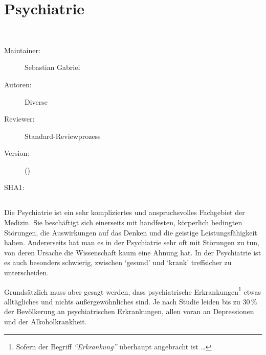 \def\ChapterCode{PSY}
\chapter
[\CO{[PSY]} Psychiatrie]
{Psychiatrie}
\label{chp:PSY}

\ChapterIntro
{%
~~~
}
{%
\begin{description}
  \item[Maintainer:] Sebastian Gabriel
  \item[Autoren:] Diverse
  \item[Reviewer:] Standard-Reviewprozess
  \item[Version:] {\VarDocVersionTypeName} ({\VarDocVersionTypeDescription})
  \item[SHA1:] {\DocGitCommit}
\end{description}

{\TxTeilkapitelAASS}
}

\clearpage


\nocite{WunnPsych1,OHCSP7}
\label{topic:unterbringungsgesetz}


\section{}

{%
Die Psychiatrie ist ein sehr kompliziertes und
anspruchsvolles Fachgebiet der Medizin. Sie beschäftigt
sich einerseits mit handfesten, körperlich bedingten
Störungen, die Auswirkungen auf das Denken und die geistige
Leistungsfähigkeit haben. Andererseits hat man es in der
Psychiatrie sehr oft mit Störungen zu tun, von deren
Ursache die Wissenschaft kaum eine Ahnung hat. In der
Psychiatrie ist es auch besonders schwierig, zwischen
\enquote*{gesund} und \enquote*{krank} treffsicher zu
unterscheiden.
}


Grundsätzlich muss aber gesagt werden, dass psychiatrische
Erkrankungen\footnote{Sofern der Begriff
\emph{\enquote{Erkrankung}} überhaupt angebracht ist \ldots}
etwas alltägliches und nichts außergewöhnliches sind. Je
nach Studie leiden bis zu 30\,\% der Bevölkerung an
psychiatrischen Erkrankungen, allen voran an Depressionen
und der Alkoholkrankheit.



